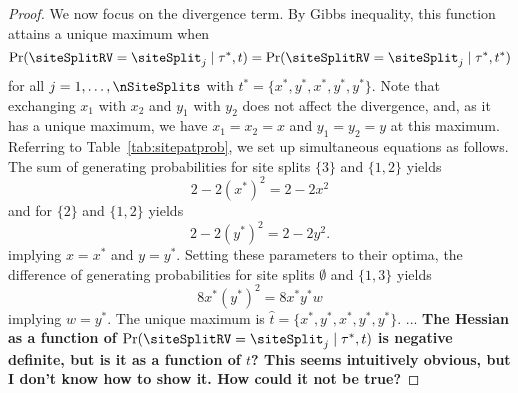 \begin{proof}
We now focus on the divergence term.
By Gibbs inequality, this function attains a unique maximum when
\[
\Pr(\siteSplitRV=\siteSplit_j \mid \tau^*, t) = \Pr(\siteSplitRV=\siteSplit_j \mid \tau^*, t^*)
\]
for all $j=1,\ldots,\nSiteSplits$ with $t^*=\{x^*,y^*,x^*,y^*,y^*\}$.
Note that exchanging $x_1$ with $x_2$ and $y_1$ with $y_2$ does not affect the divergence, and, as it has a unique maximum, we have $x_1=x_2=x$ and $y_1=y_2=y$ at this maximum.
Referring to Table~\ref{tab:sitepatprob}, we set up simultaneous equations as follows.
The sum of generating probabilities for site splits $\{3\}$ and $\{1,2\}$ yields
\[
2-2(x^*)^2 = 2-2x^2
\]
and for $\{2\}$ and $\{1,2\}$ yields
\[
2-2(y^*)^2 = 2-2y^2.
\]
implying $x=x^*$ and $y=y^*$.
Setting these parameters to their optima, the difference of generating probabilities for site splits $\emptyset$ and $\{1,3\}$ yields
\[
8x^*(y^*)^2 = 8x^*y^*w
\]
implying $w=y^*$.
The unique maximum is $\hat{t}=\{x^*,y^*,x^*,y^*,y^*\}$.%
...
\textbf{
The Hessian as a function of $\Pr(\siteSplitRV=\siteSplit_j \mid \tau^*, t)$ is negative definite, but is it as a function of $t$?
This seems intuitively obvious, but I don't know how to show it.
How could it not be true?
}
\end{proof}

